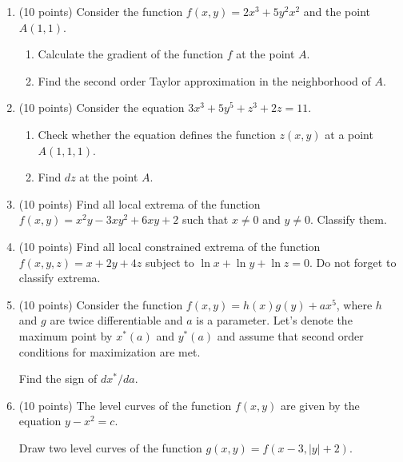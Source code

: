 \documentclass[12pt]{article} %
\theoremstyle{definition} %
\begin{document}
\begin{enumerate}

\item (10 points) Consider the function $f(x, y) = 2x^3 + 5y^2 x^2$ and the point $A(1,1)$.
\begin{enumerate}
  \item Calculate the gradient of the function $f$ at the point $A$.
  \item Find the second order Taylor approximation in the neighborhood of $A$.
\end{enumerate}

\item (10 points) Consider the equation $3x^3 + 5y^5 + z^3 + 2z=11$. 
\begin{enumerate}
  \item Check whether the equation defines the function $z(x, y)$ at a point $A(1,1,1)$.
  \item Find $dz$ at the point $A$.
\end{enumerate}


\item (10 points) Find all local extrema of the function $f(x, y) = x^2 y - 3xy^2 + 6xy +2$ such that $x\neq 0$ and $y\neq 0$. 
Classify them.

\item (10 points) Find all local constrained extrema 
of the function $f(x, y, z) = x + 2y + 4z$ subject to $\ln x + \ln y + \ln z = 0$.
Do not forget to classify extrema. 

\item (10 points) Consider the function $f(x, y) = h(x) g(y) + ax^5$, where $h$ and $g$ are twice differentiable
and $a$ is a parameter. Let's denote the maximum point by $x^*(a)$ and $y^*(a)$ and assume that second order conditions for maximization are met.

Find the sign of $dx^*/da$. 

\item (10 points) The level curves of the function $f(x,y)$ are given by the equation $y - x^2 = c$.

Draw two level curves of the function $g(x,y)=f(x-3, |y| + 2)$.

\end{enumerate}



\newpage
{}
\end{document}
